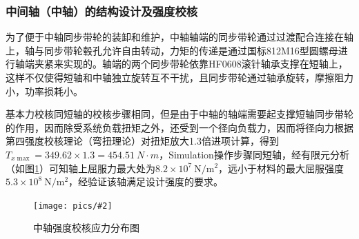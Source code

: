 \documentclass[UTF8]{article}%
\newcommand{\p}[4][0.5]{\begin{figure}[h]\centering\texttt{[image: pics/\#2]}\\\caption{#3}\label{#4}\end{figure}}%
\newcommand{\n}{\par}%
\begin{document}
\begin{spacing}{1.5}
		\subsubsection{中间轴（中轴）的结构设计及强度校核}
		为了便于中轴同步带轮的装卸和维护，中轴轴端的同步带轮通过过渡配合连接在轴上，轴与同步带轮毂孔允许自由转动，力矩的传递是通过国标812M16型圆螺母进行轴端夹紧来实现的。轴端的两个同步带轮依靠HF0608滚针轴承支撑在短轴上，这样不仅使得短轴和中轴独立旋转互不干扰，且同步带轮通过轴承旋转，摩擦阻力小，功率损耗小。\n
		基本力校核同短轴的校核步骤相同，但是由于中轴的轴端需要起支撑短轴同步带轮的作用，因而除受系统负载扭矩之外，还受到一个径向负载力，因而将径向力根据第四强度校核理论（弯扭理论）对扭矩放大1.3倍进项计算，得到$T_{x\max}=349.62\times1.3=\SI{454.51}{N\cdot m}$，Simulation操作步骤同短轴，经有限元分析（如图\ref{zzqdjh}）可知轴上屈服力最大处为$8.2\times10^7~\mathrm{N/m^2}$，远小于材料的最大屈服强度$5.3\times10^8~\mathrm{N/m^2}$，经验证该轴满足设计强度的要求。
		\p[0.4]{中轴强度校核应力分布图.png}{中轴强度校核应力分布图}{zzqdjh}

\end{spacing}
\end{document}
